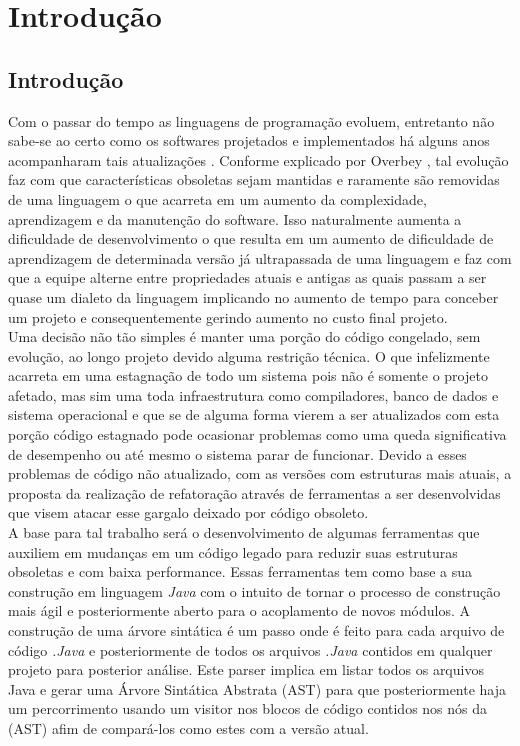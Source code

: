 \chapter{Introdução}
\section{Introdução}

Com o passar do tempo as linguagens de programação evoluem, entretanto não sabe-se ao certo como os softwares projetados e implementados há alguns anos acompanharam tais atualizações  \cite{dyer2013large}. Conforme explicado por Overbey \cite{Overbey:2009:RLR:1639949.1640127}, tal evolução faz com que características obsoletas sejam mantidas e raramente são removidas de uma linguagem o que acarreta em um aumento da complexidade, aprendizagem e da manutenção do software. Isso naturalmente aumenta a dificuldade de desenvolvimento o que resulta em um aumento de dificuldade de aprendizagem de determinada versão já ultrapassada de uma linguagem e faz com que a equipe alterne entre propriedades atuais e antigas as quais passam a ser quase um dialeto da linguagem implicando no aumento de tempo para conceber um projeto e consequentemente gerindo aumento no custo final projeto.\\

Uma decisão não tão simples é manter uma porção do código congelado, sem evolução, ao longo projeto devido alguma restrição técnica. O que infelizmente acarreta em uma estagnação de todo um sistema pois não é somente o projeto afetado, mas sim uma toda infraestrutura como compiladores, banco de dados e sistema operacional e que se de alguma forma vierem a ser atualizados com esta porção código estagnado pode ocasionar problemas como uma queda significativa de desempenho ou até mesmo o sistema parar de funcionar. Devido a esses problemas de código não atualizado, com as versões com estruturas mais atuais, a proposta da realização de refatoração através de ferramentas a ser desenvolvidas que visem atacar esse gargalo deixado por código obsoleto.\\

A base para tal trabalho será o desenvolvimento de algumas ferramentas que auxiliem em mudanças em um código legado para reduzir suas estruturas obsoletas e com baixa performance. Essas ferramentas tem como base a sua construção em linguagem {\it Java} com o intuito de tornar o processo de construção mais ágil e posteriormente aberto para o acoplamento de novos módulos. A construção de uma árvore sintática é um passo onde é feito para cada arquivo de código {\it .Java} e posteriormente de todos os arquivos {\it .Java} contidos em qualquer projeto para posterior análise. Este parser implica em listar todos os arquivos Java e gerar uma Árvore Sintática Abstrata (AST) para que posteriormente haja um percorrimento usando um visitor  \cite{Gamma:1995:DPE:186897} nos blocos de código contidos nos nós da (AST)  \cite{Dyer:2014:MBA:2568225.2568295} afim de compará-los como estes com a versão atual.\\

